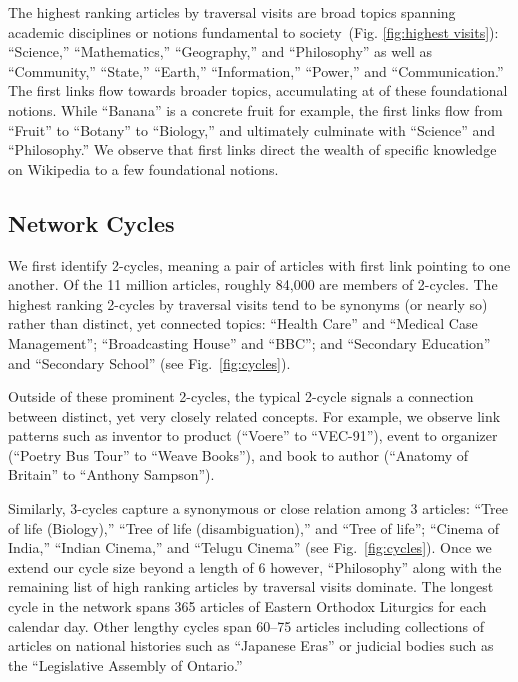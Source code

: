 \documentclass[pre,twocolumn,twoside,superscriptaddress,floatfix]{revtex4-1}
\begin{document}
{The highest ranking articles by traversal visits are broad topics spanning academic disciplines 
or notions fundamental to society~(Fig. \ref{fig:highest visits}): ``Science,'' ``Mathematics,'' ``Geography,'' and ``Philosophy''
as well as ``Community,'' ``State,'' ``Earth,'' ``Information,'' ``Power,'' and ``Communication.''
The first links flow towards broader topics, accumulating at of these foundational notions.
While ``Banana'' is a concrete fruit for example, 
the first links flow from ``Fruit'' to ``Botany'' to ``Biology,'' and ultimately 
culminate with ``Science'' and ``Philosophy.'' 
We observe that first links direct the wealth of specific knowledge on Wikipedia to 
a few foundational notions.

\subsection{Network Cycles}
\label{cycles}

We first identify 2-cycles, meaning a pair of articles with first link pointing to one another.
Of the 11 million articles, roughly 84,000 are members of 2-cycles. 
The highest ranking 2-cycles by traversal visits tend to be synonyms (or nearly so) rather than distinct, yet connected topics:
``Health Care'' and ``Medical Case Management''; ``Broadcasting House'' and ``BBC''; and ``Secondary Education'' and ``Secondary School'' 
(see Fig.~\ref{fig:cycles}).

Outside of these prominent 2-cycles, the typical 2-cycle signals a connection between distinct, yet very closely related concepts. 
For example, we observe link patterns such as inventor to product (``Voere'' to ``VEC-91''), event to organizer (``Poetry Bus Tour'' to ``Weave Books''), and book to author (``Anatomy of Britain'' to ``Anthony Sampson'').

Similarly, 3-cycles capture a synonymous or close relation among 3 articles: ``Tree of life (Biology),'' ``Tree of life (disambiguation),'' 
and ``Tree of life''; ``Cinema of India,'' ``Indian Cinema,'' and ``Telugu Cinema''
(see Fig.~\ref{fig:cycles}).
Once we extend our cycle size beyond a length of 6 however, 
``Philosophy'' along with the remaining list of high ranking articles by traversal visits dominate.
The longest cycle in the network spans 365 articles of Eastern Orthodox Liturgics for each calendar day.
Other lengthy cycles span 60--75 articles including collections of articles on national histories such as ``Japanese Eras'' 
or judicial bodies such as the ``Legislative Assembly of Ontario.''

}
\end{document}
